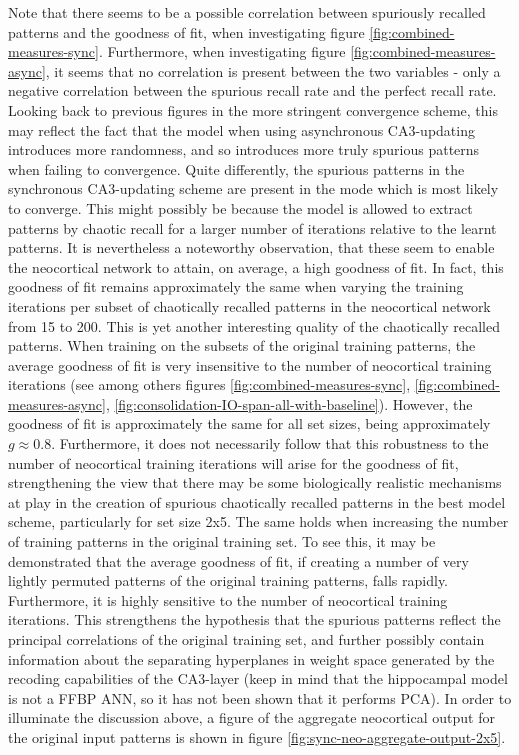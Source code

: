 Note that there seems to be a possible correlation between spuriously recalled patterns and the goodness of fit, when investigating figure \ref{fig:combined-measures-sync}. Furthermore, when investigating figure \ref{fig:combined-measures-async}, it seems that no correlation is present between the two variables - only a negative correlation between the spurious recall rate and the perfect recall rate. Looking back to previous figures in the more stringent convergence scheme, this may reflect the fact that the model when using asynchronous CA3-updating introduces more randomness, and so introduces more truly spurious patterns when failing to convergence. Quite differently, the spurious patterns in the synchronous CA3-updating scheme are present in the mode which is most likely to converge. This might possibly be because the model is allowed to extract patterns by chaotic recall for a larger number of iterations relative to the learnt patterns. 
It is nevertheless a noteworthy observation, that these seem to enable the neocortical network to attain, on average, a high goodness of fit. In fact, this goodness of fit remains approximately the same when varying the training iterations per subset of chaotically recalled patterns in the neocortical network from 15 to 200. This is yet another interesting quality of the chaotically recalled patterns. When training on the subsets of the original training patterns, the average goodness of fit is very insensitive to the number of neocortical training iterations  (see among others figures \ref{fig:combined-measures-sync}, \ref{fig:combined-measures-async}, \ref{fig:consolidation-IO-span-all-with-baseline}). However, the goodness of fit is approximately the same for all set sizes, being approximately $g\approx 0.8$. Furthermore, it does not necessarily follow that this robustness to the number of neocortical training iterations will arise for the goodness of fit, strengthening the view that there may be some biologically realistic mechanisms at play in the creation of spurious chaotically recalled patterns in the best model scheme, particularly for set size 2x5. The same holds when increasing the number of training patterns in the original training set. To see this, it may be demonstrated that the average goodness of fit, if creating a number of very lightly permuted patterns of the original training patterns, falls rapidly. Furthermore, it is highly sensitive to the number of neocortical training iterations. This strengthens the hypothesis that the spurious patterns reflect the principal correlations of the original training set, and further possibly contain information about the separating hyperplanes in weight space generated by the recoding capabilities of the CA3-layer (keep in mind that the hippocampal model is not a FFBP ANN, so it has not been shown that it performs PCA). In order to illuminate the discussion above, a figure of the aggregate neocortical output for the original input patterns is shown in figure \ref{fig:sync-neo-aggregate-output-2x5}.

